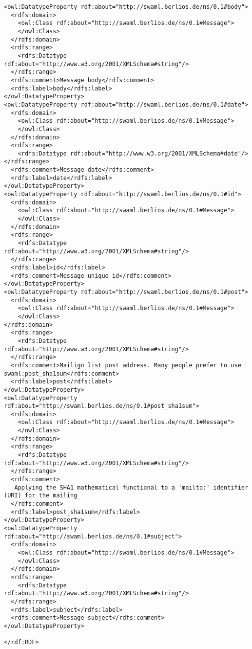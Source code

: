 \begin{lstlisting}
<owl:DatatypeProperty rdf:about="http://swaml.berlios.de/ns/0.1#body">
  <rdfs:domain>
    <owl:Class rdf:about="http://swaml.berlios.de/ns/0.1#Message">
    </owl:Class>
  </rdfs:domain>
  <rdfs:range>
    <rdfs:Datatype rdf:about="http://www.w3.org/2001/XMLSchema#string"/>
  </rdfs:range>
  <rdfs:comment>Message body</rdfs:comment>
  <rdfs:label>body</rdfs:label>
</owl:DatatypeProperty>
<owl:DatatypeProperty rdf:about="http://swaml.berlios.de/ns/0.1#date">
  <rdfs:domain>
    <owl:Class rdf:about="http://swaml.berlios.de/ns/0.1#Message">
    </owl:Class>
  </rdfs:domain>
  <rdfs:range>
    <rdfs:Datatype rdf:about="http://www.w3.org/2001/XMLSchema#date"/>
</rdfs:range>
  <rdfs:comment>Message date</rdfs:comment>
  <rdfs:label>date</rdfs:label>
</owl:DatatypeProperty>
<owl:DatatypeProperty rdf:about="http://swaml.berlios.de/ns/0.1#id">
  <rdfs:domain>
    <owl:Class rdf:about="http://swaml.berlios.de/ns/0.1#Message">
    </owl:Class>
  </rdfs:domain>
  <rdfs:range>
    <rdfs:Datatype rdf:about="http://www.w3.org/2001/XMLSchema#string"/>
  </rdfs:range>
  <rdfs:label>id</rdfs:label>
  <rdfs:comment>Message unique id</rdfs:comment>
</owl:DatatypeProperty>
<owl:DatatypeProperty rdf:about="http://swaml.berlios.de/ns/0.1#post">
  <rdfs:domain>
    <owl:Class rdf:about="http://swaml.berlios.de/ns/0.1#Message">
    </owl:Class>
</rdfs:domain>
  <rdfs:range>
    <rdfs:Datatype rdf:about="http://www.w3.org/2001/XMLSchema#string"/>
  </rdfs:range>
  <rdfs:comment>Mailign list post address. Many people prefer to use swaml:post_sha1sum</rdfs:comment>
  <rdfs:label>post</rdfs:label>
</owl:DatatypeProperty>
<owl:DatatypeProperty rdf:about="http://swaml.berlios.de/ns/0.1#post_sha1sum">
  <rdfs:domain>
    <owl:Class rdf:about="http://swaml.berlios.de/ns/0.1#Message">
    </owl:Class>
  </rdfs:domain>
  <rdfs:range>
    <rdfs:Datatype rdf:about="http://www.w3.org/2001/XMLSchema#string"/>
  </rdfs:range>
  <rdfs:comment>
   Applying the SHA1 mathematical functional to a 'mailto:' identifier (URI) for the mailing
  </rdfs:comment>
  <rdfs:label>post_sha1sum</rdfs:label>
</owl:DatatypeProperty>
<owl:DatatypeProperty rdf:about="http://swaml.berlios.de/ns/0.1#subject">
  <rdfs:domain>
    <owl:Class rdf:about="http://swaml.berlios.de/ns/0.1#Message">
    </owl:Class>
  </rdfs:domain>
  <rdfs:range>
    <rdfs:Datatype rdf:about="http://www.w3.org/2001/XMLSchema#string"/>
  </rdfs:range>
  <rdfs:label>subject</rdfs:label>
  <rdfs:comment>Message subject</rdfs:comment>
</owl:DatatypeProperty>

</rdf:RDF>
\end{lstlisting}


